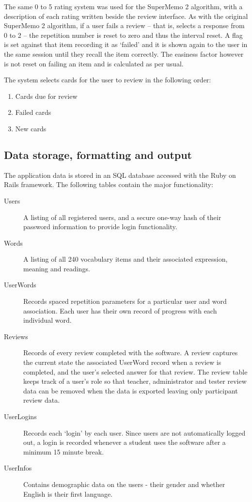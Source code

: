 The same 0 to 5 rating system was used for the SuperMemo 2 algorithm, with a description of
each rating written beside the review interface. As with the original SuperMemo 2 algorithm,
if a user fails a review -- that is, selects 
a response from 0 to 2 -- the repetition number is reset to zero and thus the interval
reset. A flag is set against that item recording it as `failed' and it is shown
again to the user in the same session until they recall the item correctly.
The easiness factor however is not reset on failing an item and is calculated as per usual.

The system selects cards for the user to review in the following order:
\begin{enumerate}
  \item Cards due for review
  \item Failed cards
  \item New cards
\end{enumerate}

\subsection{Data storage, formatting and output}

The application data is stored in an SQL database accessed with the Ruby on Rails
framework. The following tables contain the major functionality:

\begin{description}
\item[Users] A listing of all registered users, and a secure one-way hash of their password information
to provide login functionality.
\item[Words] A listing of all 240 vocabulary items and their associated expression, meaning and readings.
\item[UserWords] Records spaced repetition parameters for a particular user and word association.
Each user has their own record of progress with each individual word.
\item[Reviews] Records of every review completed with the software. A review captures the current state
the associated UserWord record when a review is completed, and the user's selected answer for that review.
The review table keeps track of a user's role so that teacher, administrator and tester review data
can be removed when the data is exported leaving only participant review data.
\item[UserLogins] Records each `login' by each user. Since users are not automatically logged out,
a login is recorded whenever a student uses the software after a minimum 15 minute break.
\item[UserInfos] Contains demographic data on the users - their gender and whether English is their first language.
\end{description}

